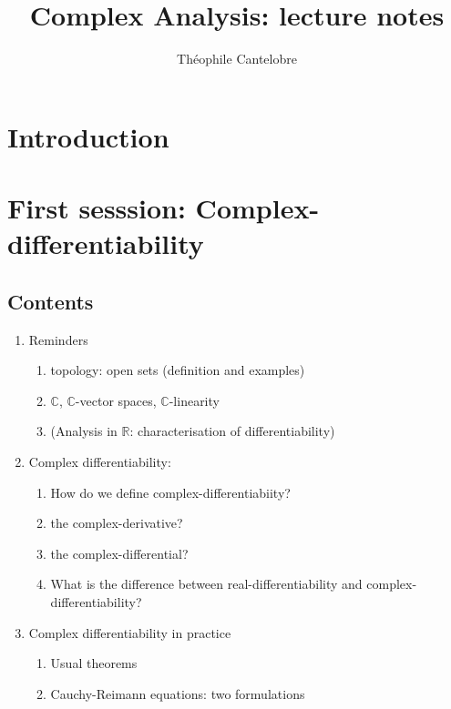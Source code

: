 \documentclass{article}
\title{Complex Analysis: lecture notes}
\author{Th\'eophile Cantelobre}
\begin{document}
\maketitle
\tableofcontents

\newpage
\section*{Introduction}


\newpage
\section{First sesssion: Complex-differentiability} 
\subsection*{Contents}
\begin{enumerate}
    \item Reminders
        \begin{enumerate}
            \item topology: open sets (definition and examples)
            \item $\mathbb{C}$, $\mathbb{C}$-vector spaces, $\mathbb{C}$-linearity
            \item (Analysis in $\mathbb{R}$: characterisation of differentiability)
        \end{enumerate}
    \item Complex differentiability:
    \begin{enumerate}
        \item How do we define complex-differentiabiity? 
        \item the complex-derivative? 
        \item the complex-differential? 
        \item What is the difference between real-differentiability and complex-differentiability?
     \end{enumerate}
        
    \item Complex differentiability in practice
    \begin{enumerate}
        \item Usual theorems
        \item Cauchy-Reimann equations: two formulations
    \end{enumerate}
\end{enumerate}
\end{document}
